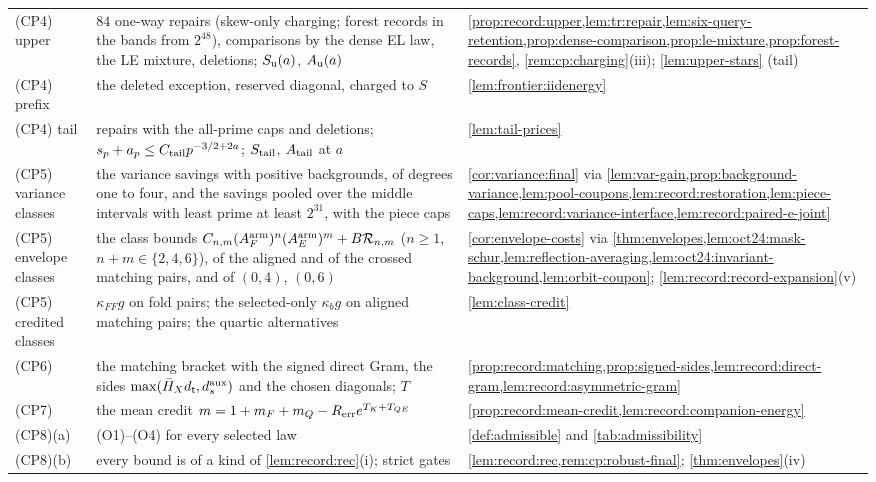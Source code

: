 {\begin{longtable}{@{}>{\raggedright\arraybackslash}p{2.75cm}>{\raggedright\arraybackslash}p{6.1cm}>{\raggedright\arraybackslash}p{5.95cm}@{}}
(CP4) upper & $84$ one-way repairs (skew-only charging; forest records in the bands from $2^{48}$), comparisons by the dense EL law, the LE mixture, deletions; $S_{\rm u}(a)$, $A_{\rm u}(a)$ & \cref{prop:record:upper,lem:tr:repair,lem:six-query-retention,prop:dense-comparison,prop:le-mixture,prop:forest-records}, \cref{rem:cp:charging}(iii); \cref{lem:upper-stars} (tail)\\
(CP4) prefix & the deleted exception, reserved diagonal, charged to $S$ & \cref{lem:frontier:iidenergy}\\
(CP4) tail & repairs with the all-prime caps and deletions; $s_p+a_p\le C_{\rm tail}p^{-3/2+2a}$; $S_{\rm tail}$, $A_{\rm tail}$ at $a$ & \cref{lem:tail-prices}\\
(CP5) variance classes & the variance savings with positive backgrounds, of degrees one to four, and the savings pooled over the middle intervals with least prime at least $2^{31}$, with the piece caps & \cref{cor:variance:final} via \cref{lem:var-gain,prop:background-variance,lem:pool-coupons,lem:record:restoration,lem:piece-caps,lem:record:variance-interface,lem:record:paired-e-joint}\\
(CP5) envelope classes & the class bounds $C_{n,m}(A^{\rm arm}_F)^n(A^{\rm arm}_E)^m+B\mathcal R_{n,m}$ ($n\ge1$, $n+m\in\{2,4,6\}$), of the aligned and of the crossed matching pairs, and of $(0,4)$, $(0,6)$ & \cref{cor:envelope-costs} via \cref{thm:envelopes,lem:oct24:mask-schur,lem:reflection-averaging,lem:oct24:invariant-background,lem:orbit-coupon}; \cref{lem:record:record-expansion}(v)\\
(CP5) credited classes & $\kappa_{FF}g$ on fold pairs; the selected-only $\kappa_bg$ on aligned matching pairs; the quartic alternatives & \cref{lem:class-credit}\\
(CP6) & the matching bracket with the signed direct Gram, the sides $\max(\bar H_Xd_\mathsf t,d^{\rm aux}_s)$ and the chosen diagonals; $T$ & \cref{prop:record:matching,prop:signed-sides,lem:record:direct-gram,lem:record:asymmetric-gram}\\
(CP7) & the mean credit $m=1+m_F+m_Q-R_{\rm err}e^{T_K+T_{QE}}$ & \cref{prop:record:mean-credit,lem:record:companion-energy}\\
(CP8)(a) & (O1)--(O4) for every selected law & \cref{def:admissible} and \cref{tab:admissibility}\\
(CP8)(b) & every bound is of a kind of \cref{lem:record:rec}(i); strict gates & \cref{lem:record:rec,rem:cp:robust-final}; \cref{thm:envelopes}(iv)\\

\end{longtable}}
